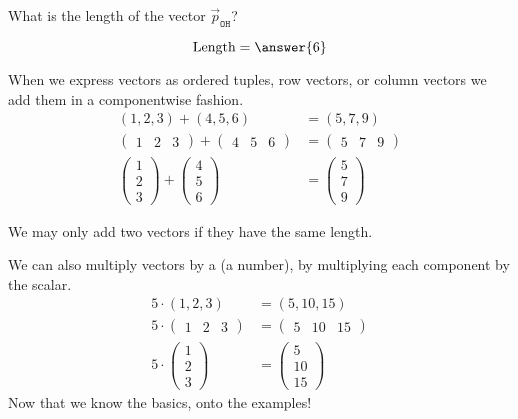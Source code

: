 \documentclass{ximera}
\begin{document}
\begin{question}
  What is the length of the vector $\vec{p}_{\texttt{OH}}$?
  \begin{prompt}
  \[
  \text{Length} = \answer{6}
  \]
  \end{prompt}
\end{question}
When we express vectors as ordered tuples, row vectors, or column
vectors we add them in a componentwise fashion.
\begin{align*}
  (1,2,3) + (4,5,6) &= (5,7,9)\\
  \begin{pmatrix} 1 & 2 & 3   \end{pmatrix} + \begin{pmatrix} 4 & 5 & 6   \end{pmatrix}&= \begin{pmatrix} 5 & 7 & 9   \end{pmatrix}\\
  \begin{pmatrix} 1\\ 2\\ 3   \end{pmatrix} + \begin{pmatrix} 4\\ 5\\ 6   \end{pmatrix} &= \begin{pmatrix} 5\\ 7\\ 9   \end{pmatrix}
\end{align*}
\begin{warning}
  We may only add two vectors if they have the same length.
\end{warning}




We can also multiply vectors by a  (a number), by
multiplying each component by the scalar.
\begin{align*}
  5\cdot   (1,2,3) &= (5,10,15)\\
  5\cdot \begin{pmatrix} 1 & 2 & 3   \end{pmatrix}  &= \begin{pmatrix} 5 & 10 & 15   \end{pmatrix}\\
  5\cdot  \begin{pmatrix} 1\\ 2\\ 3   \end{pmatrix} &= \begin{pmatrix} 5\\ 10\\ 15   \end{pmatrix}
\end{align*}
Now that we know the basics, onto the examples!
\end{document}
